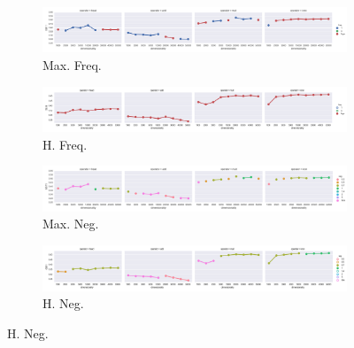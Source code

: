 


\begin{landscape}

\begin{figure}
  \centering

  \begin{subfigure}[t]{0.7\textwidth}
    \includegraphics[width=\textwidth]{supplement/figures/GS11-max_-selection-freq}
    \caption{Max. Freq.}
    \label{fig:}
  \end{subfigure}
  \begin{subfigure}[t]{0.7\textwidth}
    \includegraphics[width=\textwidth]{supplement/figures/GS11-heuristics-selection-freq}
    \caption{H. Freq.}
    \label{fig:}
  \end{subfigure}

  \begin{subfigure}[t]{0.7\textwidth}
    \includegraphics[width=\textwidth]{supplement/figures/GS11-max_-selection-neg}
    \caption{Max. Neg.}
    \label{fig:}
  \end{subfigure}
  \begin{subfigure}[t]{0.7\textwidth}
    \includegraphics[width=\textwidth]{supplement/figures/GS11-heuristics-selection-neg}
    \caption{H. Neg.}
    \label{fig:}
  \end{subfigure}


\end{figure}
\end{landscape}
